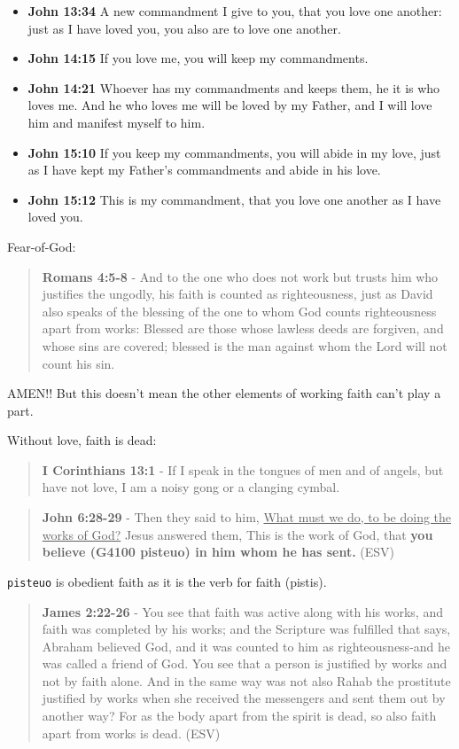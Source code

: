 \documentclass[11pt]{article}
\begin{document}
\begin{itemize}
\item \textbf{John 13:34} A new commandment I give to you, that you love one another: just as I have loved you, you also are to love one another.
\item \textbf{John 14:15} If you love me, you will keep my commandments.
\item \textbf{John 14:21} Whoever has my commandments and keeps them, he it is who loves me. And he who loves me will be loved by my Father, and I will love him and manifest myself to him.
\item \textbf{John 15:10} If you keep my commandments, you will abide in my love, just as I have kept my Father's commandments and abide in his love.
\item \textbf{John 15:12} This is my commandment, that you love one another as I have loved you.
\end{itemize}

Fear-of-God:

\begin{quote}
\textbf{Romans 4:5-8} - And to the one who does not work but trusts him who justifies the ungodly, his faith is counted as righteousness, just as David also speaks of the blessing of the one to whom God counts righteousness apart from works: Blessed are those whose lawless deeds are forgiven, and whose sins are covered; blessed is the man against whom the Lord will not count his sin.
\end{quote}

AMEN!! But this doesn't mean the other elements of working faith can't play a part.

Without love, faith is dead:

\begin{quote}
\textbf{I Corinthians 13:1} - If I speak in the tongues of men and of angels, but have not love, I am a noisy gong or a clanging cymbal.
\end{quote}

\begin{quote}
\textbf{John 6:28-29} - Then they said to him, \uline{What must we do, to be doing the works of God?} Jesus answered them, This is the work of God, that \textbf{you believe (G4100 pisteuo) in him whom he has sent.} (ESV)
\end{quote}

\texttt{pisteuo} is obedient faith as it is the verb for faith (pistis).

\begin{quote}
\textbf{James 2:22-26} - You see that faith was active along with his works, and faith was completed by his works; and the Scripture was fulfilled that says, Abraham believed God, and it was counted to him as righteousness-and he was called a friend of God. You see that a person is justified by works and not by faith alone. And in the same way was not also Rahab the prostitute justified by works when she received the messengers and sent them out by another way? For as the body apart from the spirit is dead, so also faith apart from works is dead. (ESV)
\end{quote}
\end{document}
